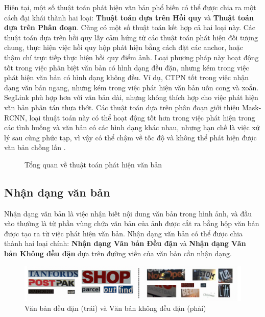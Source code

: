 Hiện tại, một số thuật toán phát hiện văn bản phổ biến có thể được chia ra một cách đại khái thành hai loại: \textbf{Thuật toán dựa trên Hồi quy} và \textbf{Thuật toán dựa trên Phân đoạn}. Cũng có một số thuật toán kết hợp cả hai loại này. Các thuật toán dựa trên hồi quy lấy cảm hứng từ các thuật toán phát hiện đối tượng chung, thực hiện việc hồi quy hộp phát hiện bằng cách đặt các anchor, hoặc thậm chí trực tiếp thực hiện hồi quy điểm ảnh. Loại phương pháp này hoạt động tốt trong việc phân biệt văn bản có hình dạng đều đặn, nhưng kém trong việc phát hiện văn bản có hình dạng không đều. Ví dụ, CTPN tốt trong việc nhận dạng văn bản ngang, nhưng kém trong việc phát hiện văn bản uốn cong và xoắn. SegLink phù hợp hơn với văn bản dài, nhưng không thích hợp cho việc phát hiện văn bản phân tán thưa thớt. Các thuật toán dựa trên phân đoạn giới thiệu Mask-RCNN, loại thuật toán này có thể hoạt động tốt hơn trong việc phát hiện trong các tình huống và văn bản có các hình dạng khác nhau, nhưng hạn chế là việc xử lý sau cùng phức tạp, vì vậy có thể chậm về tốc độ và không thể phát hiện được văn bản chồng lấn \cite{Dive-into-ocr-2022}.

\begin{figure}[h]
    
    \centering
    \caption{Tổng quan về thuật toán phát hiện văn bản}
\end{figure}

\subsection{Nhận dạng văn bản}
Nhận dạng văn bản là việc nhận biết nội dung văn bản trong hình ảnh, và đầu vào thường là từ phần vùng chứa văn bản của ảnh được cắt ra bằng hộp văn bản được tạo ra từ việc phát hiện văn bản. Nhận dạng văn bản có thể được chia thành hai loại chính: \textbf{Nhận dạng Văn bản Đều đặn} và \textbf{Nhận dạng Văn bản Không đều đặn} dựa trên đường viền của văn bản cần nhận dạng.

\begin{figure}[h]
    \includegraphics[scale=0.4]{images/regular-irregular-text.png}
    \centering
    \caption{Văn bản đều đặn (trái) và Văn bản không đều đặn (phải)}
\end{figure}


